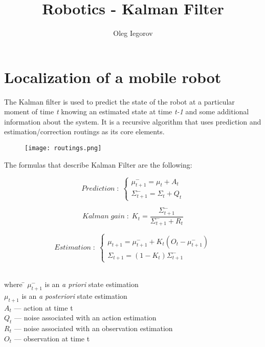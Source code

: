 \documentclass{article}
\begin{document}
\title{Robotics - Kalman Filter}

\author{Oleg Iegorov}

\maketitle

\section{Localization of a mobile robot}

The Kalman filter is used to predict the state of the robot at a particular
moment of time \emph{t} knowing an estimated state at time \emph{t-1}
and some additional information about the system. It is a recursive
algorithm that uses prediction and estimation/correction routings as its core
elements.

\begin{figure}[H] \centering
  \texttt{[image: routings.png]}
\end{figure}

The formulas that describe Kalman Filter are the following:

\begin{equation} \label{eq:prediction}
  Prediction\;:\; 
  \left\{ 
    \begin{array}{ c }
      \mu^{-}_{t+1} = \mu_t + A_t \\
      \Sigma^{-}_{t+1} = \Sigma_t + Q_t
    \end{array}
  \right.
\end{equation}

\begin{equation} \label{eq:kalman_gain}
  Kalman\;gain\;:\; K_t = \frac{\Sigma^{-}_{t+1}}{\Sigma^{-}_{t+1} + R_t}
\end{equation}

\begin{equation} \label{eq:estimation}
  Estimation\;:\; 
  \left\{ 
    \begin{array}{ c }
      \mu_{t+1} = \mu^{-}_{t+1} + K_t(O_t - \mu^{-}_{t+1}) \\
      \Sigma_{t+1} = (1 - K_t)\Sigma^{-}_{t+1}
    \end{array}
  \right.
\end{equation}
\\
\begin{tabbing}
\hspace{10mm}where \hspace{5mm} \= $\mu^{-}_{t+1}$ is an \emph{a priori} state estimation \\
\> $\mu_{t+1}$ is an \emph{a posteriori} state estimation\\
\> $A_t$ --- action at time t\\
\> $Q_t$ --- noise associated with an action estimation\\
\> $R_t$ --- noise associated with an observation estimation\\
\> $O_t$ --- observation at time t
\end{tabbing}
\end{document}

